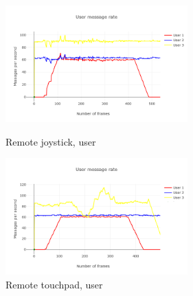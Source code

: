 \documentclass{l4proj}
\begin{document}
\begin{figure}[h!]
    \centering
    \begin{minipage}{0.45\textwidth}
        \centering
        \includegraphics[width=7cm]{./images/rjoyumess.png} %
        \caption{Remote joystick, user}
        \label{rjoyu}
    \end{minipage}\hfill
    \begin{minipage}{0.45\textwidth}
        \centering
        \includegraphics[width=7cm]{./images/rtouchumess.png} %
        \caption{Remote touchpad, user}
        \label{rtouchu}
    \end{minipage}
\end{figure}
\end{document}

